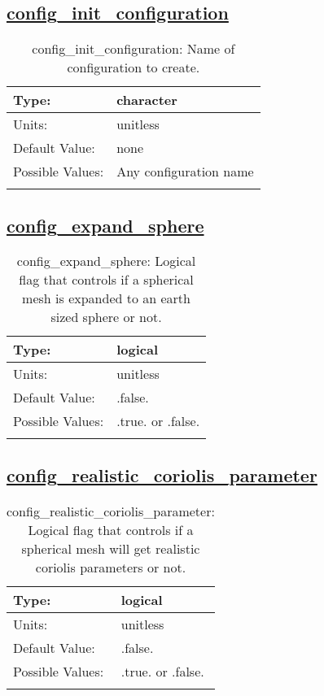\subsection[config\_init\_configuration]{\hyperref[sec:nm_tab_init_setup]{config\_init\_configuration}}
\label{subsec:nm_sec_config_init_configuration}
\begin{center}
\begin{longtable}{| p{2.0in} || p{4.0in} |}
    \hline
    Type: & character \\
    \hline
    Units: & \si{unitless} \\
    \hline
    Default Value: & none \\
    \hline
    Possible Values: & Any configuration name \\
    \hline
    \caption{config\_init\_configuration: Name of configuration to create.}
\end{longtable}
\end{center}
\subsection[config\_expand\_sphere]{\hyperref[sec:nm_tab_init_setup]{config\_expand\_sphere}}
\label{subsec:nm_sec_config_expand_sphere}
\begin{center}
\begin{longtable}{| p{2.0in} || p{4.0in} |}
    \hline
    Type: & logical \\
    \hline
    Units: & \si{unitless} \\
    \hline
    Default Value: & .false. \\
    \hline
    Possible Values: & .true. or .false. \\
    \hline
    \caption{config\_expand\_sphere: Logical flag that controls if a spherical mesh is expanded to an earth sized sphere or not.}
\end{longtable}
\end{center}
\subsection[config\_realistic\_coriolis\_parameter]{\hyperref[sec:nm_tab_init_setup]{config\_realistic\_coriolis\_parameter}}
\label{subsec:nm_sec_config_realistic_coriolis_parameter}
\begin{center}
\begin{longtable}{| p{2.0in} || p{4.0in} |}
    \hline
    Type: & logical \\
    \hline
    Units: & \si{unitless} \\
    \hline
    Default Value: & .false. \\
    \hline
    Possible Values: & .true. or .false. \\
    \hline
    \caption{config\_realistic\_coriolis\_parameter: Logical flag that controls if a spherical mesh will get realistic coriolis parameters or not.}
\end{longtable}
\end{center}
